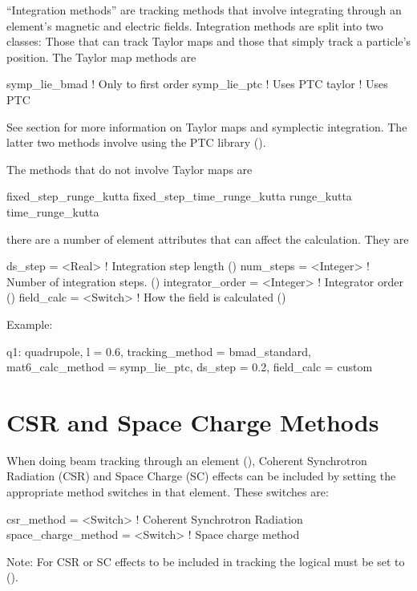 ``Integration methods'' are tracking methods that involve integrating through an element's magnetic
and electric fields.  Integration methods are split into two classes: Those that can track Taylor
maps and those that simply track a particle's position.  The Taylor map methods are
\begin{example}
  symp_lie_bmad   ! Only to first order
  symp_lie_ptc    ! Uses PTC
  taylor          ! Uses PTC
\end{example}
See section  for more information on Taylor maps and symplectic integration. The
latter two methods involve using the PTC library ().

The methods that do not involve Taylor maps are
\begin{example}
  fixed_step_runge_kutta
  fixed_step_time_runge_kutta
  runge_kutta
  time_runge_kutta
\end{example}

there are a number of element attributes that can affect the calculation. They are
\begin{example}
  ds_step             = <Real>     ! Integration step length ()
  num_steps           = <Integer>  ! Number of integration steps. ()
  integrator_order    = <Integer>  ! Integrator order ()
  field_calc          = <Switch>   ! How the field is calculated ()
\end{example}

Example:
\begin{example}
  q1: quadrupole, l = 0.6, tracking_method = bmad_standard, 
        mat6_calc_method = symp_lie_ptc, ds_step = 0.2, field_calc = custom
\end{example}

\section{CSR and Space Charge Methods}
\label{s:csr.sc.meth}

When doing beam tracking through an element (), Coherent Synchrotron Radiation
(CSR) and Space Charge (SC) effects can be included by setting the appropriate method switches in
that element. These switches are:
\begin{example}
  csr_method          = <Switch>   ! Coherent Synchrotron Radiation 
  space_charge_method = <Switch>   ! Space charge method
\end{example}
Note: For CSR or SC effects to be included in tracking the  logical
 must be set to  ().

